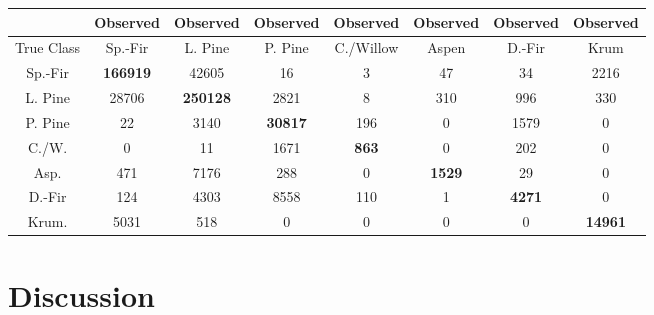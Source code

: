 \documentclass[11pt]{article}
\begin{document}
\begin{center}
\begin{tabular}{|c | c| c| c| c| c |c| c|}
\hline
 & Observed& Observed& Observed& Observed& Observed& Observed& Observed \\ \hline
True Class & Sp.-Fir & L. Pine & P. Pine & C./Willow & Aspen & D.-Fir & Krum \\ \hline
Sp.-Fir & \textbf{166919} & 42605 & 16 & 3 & 47 & 34 & 2216 \\ \hline
L. Pine & 28706 & \textbf{250128} & 2821 & 8 & 310 & 996 & 330 \\ \hline
P. Pine & 22 & 3140 &  \textbf{30817} & 196 & 0 & 1579 & 0 \\ \hline
C./W. & 0 & 11 & 1671 &  \textbf{863} & 0 & 202 & 0 \\ \hline
Asp. & 471 & 7176 & 288 & 0 &  \textbf{1529} & 29 & 0 \\ \hline
D.-Fir & 124 & 4303 & 8558 & 110 & 1 &  \textbf{4271} & 0 \\ \hline
Krum. & 5031 & 518 & 0 & 0 & 0 & 0 &  \textbf{14961} \\ \hline
\end{tabular}
\end{center}

\section{Discussion}
\end{document}
